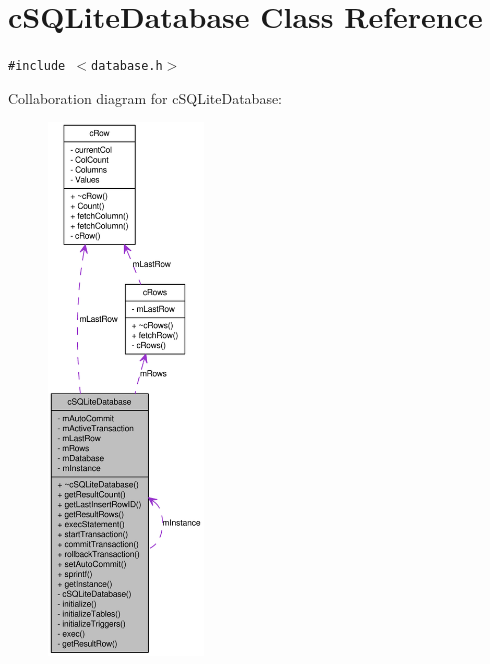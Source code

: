 \hypertarget{classcSQLiteDatabase}{
\section{cSQLiteDatabase Class Reference}
\label{classcSQLiteDatabase}
}
{\tt \#include $<$database.h$>$}

Collaboration diagram for cSQLiteDatabase:\nopagebreak
\begin{figure}[H]
\begin{center}
\leavevmode
\includegraphics[height=400pt]{classcSQLiteDatabase__coll__graph}
\end{center}
\end{figure}
